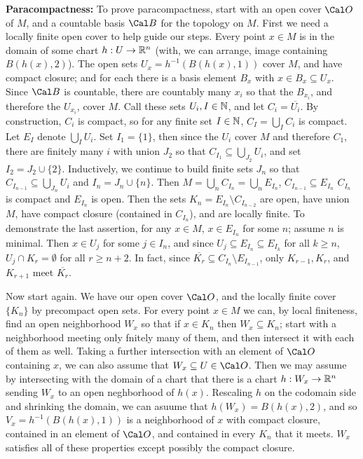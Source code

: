 {\bf Paracompactness:} To prove paracompactness, start with an open cover $\Cal O$ of $M$, and a countable basis $\Cal B$
for the topology on $M$. First we need a locally 
finite open cover to help guide our steps. Every point $x\in M$ is in the domain of some 
chart $h:U\rightarrow {\Bbb R}^n$ (with, we can arrange, image containing $B(h(x),2)$). The 
open sets $U_x=h^{-1}(B(h(x),1))$ cover $M$, and have compact closure; and for each there is 
a basis element $B_x$ with $x\in B_x\subseteq U_x$. Since $\Cal B$ is countable, 
there are countably many $x_i$ so that the $B_{x_i}$, and therefore the $U_{x_i}$,
cover $M$. Call these sets $U_i, I\in {\Bbb N}$, and let $C_i=\overline{U_i}$. By construction,
$C_i$ is compact, so for any finite set $I\in{\Bbb N}$, $C_I=\bigcup_I C_i$ is compact. 
Let $E_I$ denote $\bigcup_I U_i$.
Set $I_1=\{1\}$, then since the $U_i$ cover $M$ and therefore $C_1$, there are finitely
many $i$ with union $J_2$ so that $C_{I_1}\subseteq \bigcup_{J_2}U_i$, and set $I_2=J_2\cup\{2\}$.
Inductively, we continue to build finite sets $J_n$ so that $C_{I_{n-1}}\subseteq \bigcup_{J_n}U_i$
and $I_n=J_n\cup\{n\}$. Then $M=\bigcup_n C_{I_n} = \bigcup_n E_{I_n}$, $C_{I_{n-1}}\subseteq E_{I_n}$
$C_{I_n}$ is compact and $E_{I_n}$ is open. Then the sets 
$K_n=E_{I_n}\setminus C_{I_{n-2}}$ are open, have union $M$, have compact closure (contained in $C_{I_n}$),
and are locally finite. To demonstrate
the last assertion, for any $x\in M$, 
$x\in E_{I_n}$ for some $n$; assume $n$ is minimal. Then $x\in U_j$ for some $j\in I_n$, and since
$U_j\subseteq E_{I_n}\subseteq E_{I_k}$ for all $k\geq n$, $U_j\cap K_r=\emptyset$ for all $r\geq n+2$.
In fact, since $\overline{K_r}\subseteq C_{I_n}\setminus E_{I_{n-1}}$, only $K_{r-1}, K_r$, and $K_{r+1}$
meet $\overline{K_r}$.

\ssk

Now start again. We have our open cover ${\Cal O}$, and the locally finite cover $\{K_n\}$ by 
precompact open sets. For every point $x\in M$ we can, by local finiteness, find an open neighborhood $W_x$ so that
if $x\in K_n$ then $W_x\subseteq K_n$; start with a neighborhood meeting only fnitely many of them, and then
intersect it with each of them as well. Taking a further intersection with an element of $\Cal O$ containing
$x$, we can also assume that $W_x\subseteq U\in {\Cal O}$. Then we may assume by intersecting with 
the domain of a chart
that there is a chart $h:W_x\rightarrow {\Bbb R}^n$ sending $W_x$ to an open neghborhood of $h(x)$. Rescaling
$h$ on the codomain side and shrinking the domain, we can asuume that $h(W_x)=B(h(x),2)$, and 
so $V_x=h^{-1}(B(h(x),1))$ is a neighborhood of $x$ with compact closure, contained in an element of
$\Cal O$, and contained in every $K_n$ that it meets. $W_x$ satisfies all of these properties
except possibly the compact closure.

